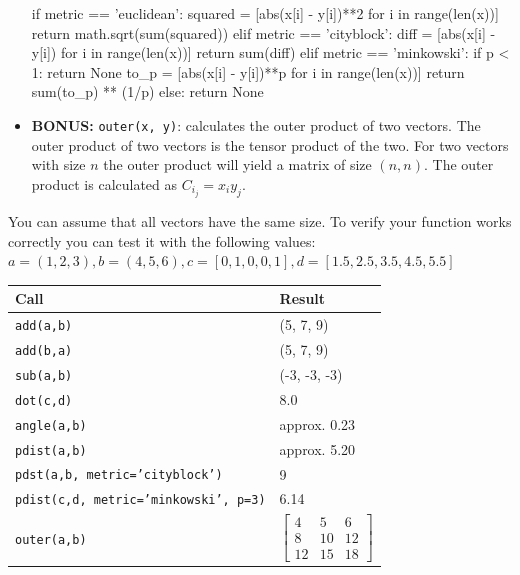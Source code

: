 \begin{itemize}
{\begin{python}
    if metric == 'euclidean':
        squared = [abs(x[i] - y[i])**2 for i in range(len(x))]
        return math.sqrt(sum(squared))
    elif metric == 'cityblock':
        diff = [abs(x[i] - y[i]) for i in range(len(x))]
        return sum(diff)
    elif metric == 'minkowski':
        if p < 1:
            return None
        to_p = [abs(x[i] - y[i])**p for i in range(len(x))]
        return sum(to_p) ** (1/p)
    else:
        return None
\end{python}
}
  \item \textbf{BONUS:} \texttt{outer(x, y)}: calculates the outer product of two vectors. The outer product of two vectors is the tensor product of the two. For two vectors with size $n$ the outer product will yield a matrix of size $(n, n)$.
  The outer product is calculated as $C_{i_j} = x_iy_j$.
  \cprotect{}
\end{itemize}
You can assume that all vectors have the same size. To verify your function works correctly you can test it with the following values:\\
$a = (1, 2, 3), b = (4, 5, 6), c = [0, 1, 0, 0, 1], d = [1.5, 2.5, 3.5, 4.5, 5.5]$\\
\begin{tabular}{|ll|}
  \hline
  Call & Result \\
  \hline
  \texttt{add(a,b)} & (5, 7, 9)\\
  \texttt{add(b,a)} & (5, 7, 9)\\
  \texttt{sub(a,b)} & (-3, -3, -3)\\
  \texttt{dot(c,d)} & 8.0\\
  \texttt{angle(a,b)} & approx. 0.23\\
  \texttt{pdist(a,b)} & approx. 5.20\\
  \texttt{pdst(a,b, metric='cityblock')} & 9\\
  \texttt{pdist(c,d, metric='minkowski', p=3)} & 6.14\\
  \texttt{outer(a,b)} & $\left[\begin{matrix} 4 & 5 & 6\\ 8 & 10 & 12\\ 12 & 15 & 18 \end{matrix}\right]$\\
  \hline
\end{tabular}
